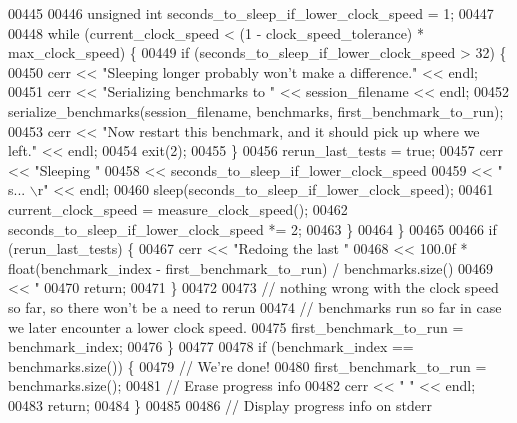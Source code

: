 \begin{DoxyCode}
{{{{00445 
00446         \textcolor{keywordtype}{unsigned} \textcolor{keywordtype}{int} seconds\_to\_sleep\_if\_lower\_clock\_speed = 1;
00447 
00448         \textcolor{keywordflow}{while} (current\_clock\_speed < (1 - clock\_speed\_tolerance) * max\_clock\_speed) \{
00449           \textcolor{keywordflow}{if} (seconds\_to\_sleep\_if\_lower\_clock\_speed > 32) \{
00450             cerr << \textcolor{stringliteral}{"Sleeping longer probably won't make a difference."} << endl;
00451             cerr << \textcolor{stringliteral}{"Serializing benchmarks to "} << session\_filename << endl;
00452             serialize\_benchmarks(session\_filename, benchmarks, first\_benchmark\_to\_run);
00453             cerr << \textcolor{stringliteral}{"Now restart this benchmark, and it should pick up where we left."} << endl;
00454             exit(2);
00455           \}
00456           rerun\_last\_tests = \textcolor{keyword}{true};
00457           cerr << \textcolor{stringliteral}{"Sleeping "}
00458                << seconds\_to\_sleep\_if\_lower\_clock\_speed
00459                << \textcolor{stringliteral}{" s...                                   \(\backslash\)r"} << endl;
00460           sleep(seconds\_to\_sleep\_if\_lower\_clock\_speed);
00461           current\_clock\_speed = measure\_clock\_speed();
00462           seconds\_to\_sleep\_if\_lower\_clock\_speed *= 2;
00463         \}
00464       \}
00465 
00466       \textcolor{keywordflow}{if} (rerun\_last\_tests) \{
00467         cerr << \textcolor{stringliteral}{"Redoing the last "}
00468              << 100.0f * float(benchmark\_index - first\_benchmark\_to\_run) / benchmarks.size()
00469              << \textcolor{stringliteral}{" %
00470         \textcolor{keywordflow}{return};
00471       \}
00472 
00473       \textcolor{comment}{// nothing wrong with the clock speed so far, so there won't be a need to rerun}
00474       \textcolor{comment}{// benchmarks run so far in case we later encounter a lower clock speed.}
00475       first\_benchmark\_to\_run = benchmark\_index;
00476     \}
00477 
00478     \textcolor{keywordflow}{if} (benchmark\_index == benchmarks.size()) \{
00479       \textcolor{comment}{// We're done!}
00480       first\_benchmark\_to\_run = benchmarks.size();
00481       \textcolor{comment}{// Erase progress info}
00482       cerr << \textcolor{stringliteral}{"                                                            "} << endl;
00483       \textcolor{keywordflow}{return};
00484     \}
00485 
00486     \textcolor{comment}{// Display progress info on stderr}
}}}}}
\end{DoxyCode}
